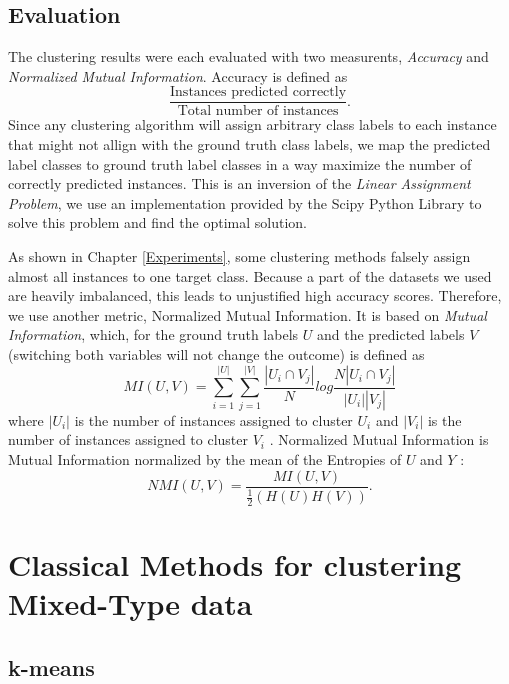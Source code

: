 \subsection{Evaluation}

The clustering results were each evaluated with two measurents, \textit{Accuracy} and \textit{Normalized Mutual Information}. Accuracy is defined as 
$$\frac{\text{Instances predicted correctly}}{\text{Total number of instances}}.$$
Since any clustering algorithm will assign arbitrary class labels to each instance that might not allign with the ground truth class labels, we map the predicted label classes to ground truth label classes in a way maximize the number of correctly predicted instances. This is an inversion of the \textit{Linear Assignment Problem}, we use an implementation provided by the Scipy Python Library \cite{scipy} to solve this problem and find the optimal solution. 

As shown in Chapter \ref{Experiments}, some clustering methods falsely assign almost all instances to one target class. Because a part of the datasets we used are heavily imbalanced, this leads to unjustified high accuracy scores. Therefore, we use another metric, Normalized Mutual Information. It is based on \textit{Mutual Information}, which, for the ground truth labels $U$ and the predicted labels $V$ (switching both variables will not change the outcome) is defined as
$$MI(U,V) = \sum^{|U|}_{i=1}\sum^{|V|}_{j=1} \frac{|U_i \cap V_j|}{N} log\frac{N|U_i \cap V_j|}{|U_i||V_j|}$$
where $|U_i|$ is the number of instances assigned to cluster $U_i$ and $|V_i|$ is the number of instances assigned to cluster $V_i$ \cite{scikit_learn}. Normalized Mutual Information is Mutual Information normalized by the mean of the Entropies of $U$ and $Y$ \cite{scikit_learn}:
$$NMI(U,V) = \frac{MI(U,V)}{\frac{1}{2}(H(U)H(V))}.$$

\section{Classical Methods for clustering Mixed-Type data} \label{Classical Methods for clustering Mixed-Type data}

\subsection{k-means}

